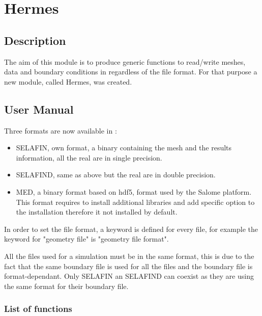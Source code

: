 \chapter{Hermes}
\label{ref:hermes}
\section{Description}
%
The aim of this module is to produce generic functions to read/write meshes,
data and boundary conditions in \telemacsystem regardless of the file format. For that
purpose a new module, called Hermes, was created.
%
\section{User Manual}
%
Three formats are now available in \telemacsystem:
\begin{itemize}
\item SELAFIN, \telemacsystem own format, a binary containing the mesh and the results
information, all the real are in single precision.
\item SELAFIND, same as above but the real are in double precision.
\item MED, a binary format based on hdf5, format used by the Salome platform.
This format requires to install additional libraries and add specific option
to the \telemacsystem installation therefore it not installed by default.
\end{itemize}

In order to set the file format, a keyword is defined for every file, for
example the keyword for "geometry file" is "geometry file format".

All the files used for a simulation must be in the same format, this is due to
the fact that the same boundary file is used for all the files and the boundary
file is format-dependant. Only SELAFIN an SELAFIND can coexist as they are
using the same format for their boundary file.
\subsection{List of functions}
\label{listfunc}
